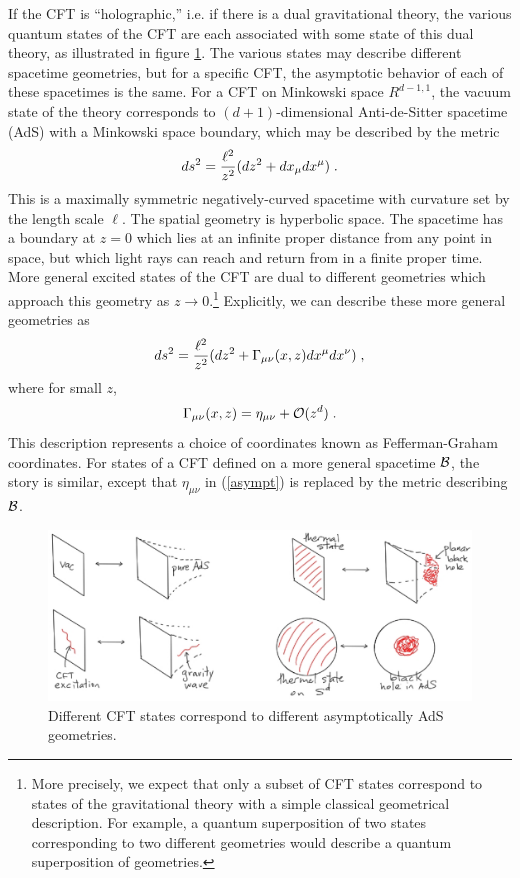 \documentclass[12pt,epsf]{article}
\newcommand{\be}{\begin{equation}}
\newcommand{\ee}{\end{equation}}
\begin{document}
If the CFT is ``holographic,'' i.e. if there is a dual gravitational theory, the various quantum states of the CFT are each associated with some state of this dual theory, as illustrated in figure \ref{adscft2}. The various states may describe different spacetime geometries, but for a specific CFT, the asymptotic behavior of each of these spacetimes is the same. For a CFT on Minkowski space $R^{d-1,1}$, the vacuum state of the theory corresponds to $(d+1)$-dimensional Anti-de-Sitter spacetime (AdS) with a Minkowski space boundary, which may be described by the metric
\be
ds^2 = {\ell^2 \over z^2} ( dz^2 + dx_\mu dx^\mu) \; .
\ee
This is a maximally symmetric negatively-curved spacetime with curvature set by the length scale $\ell$. The spatial geometry is hyperbolic space. The spacetime has a boundary at $z=0$ which lies at an infinite proper distance from any point in space, but which light rays can reach and return from in a finite proper time. More general excited states of the CFT are dual to different geometries which approach this geometry as $z \to 0$.\footnote{More precisely, we expect that only a subset of CFT states correspond to states of the gravitational theory with a simple classical geometrical description. For example, a quantum superposition of two states corresponding to two different geometries would describe a quantum superposition of geometries.} Explicitly, we can describe these more general geometries as
\be
\label{FG}
ds^2 = {\ell^2 \over z^2} ( dz^2 + \Gamma_{\mu \nu}(x,z) dx^\mu dx^\nu) \; ,
\ee
where for small $z$,
\be
\label{asympt}
\Gamma_{\mu \nu}(x,z) = \eta_{\mu \nu} + {\cal O}(z^d) \; .
\ee
This description represents a choice of coordinates known as Fefferman-Graham coordinates. For states of a CFT defined on a more general spacetime ${\cal B}$, the story is similar, except that $\eta_{\mu \nu}$ in (\ref{asympt}) is replaced by the metric describing ${\cal B}$.

\begin{figure}
\centering
\includegraphics[width=\textwidth]{adscft2.eps}
\caption{Different CFT states correspond to different asymptotically AdS geometries.}
\label{adscft2}
\end{figure}
\end{document}
